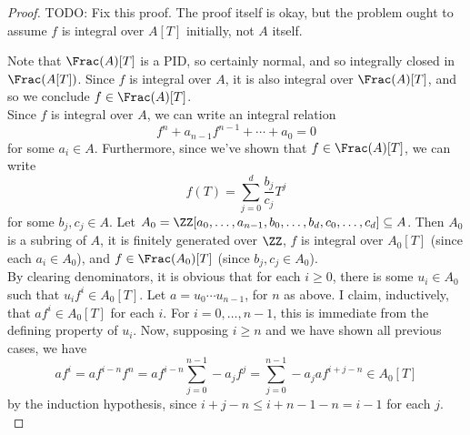 \begin{proof}
	TODO: Fix this proof. The proof itself is okay, but the problem ought to assume $f$ is integral over $A[T]$ initially, not $A$ itself.
	
	
	Note that $\Frac(A)[T]$ is a PID, so certainly normal, and so integrally closed in $\Frac(A[T])$. Since $f$ is integral over $A$, it is also integral over $\Frac(A)[T]$, and so we conclude $f \in \Frac(A)[T]$. \\
	
	Since $f$ is integral over $A$, we can write an integral relation
	\[ f^n + a_{n-1}f^{n-1} + \cdots + a_0 = 0 \]
	for some $a_i \in A$. Furthermore, since we've shown that $f \in \Frac(A)[T]$, we can write
	\[ f(T) = \sum_{j=0}^d \frac{b_j}{c_j}T^j \]
	for some $b_j,c_j \in A$. Let $A_0 = \ZZ[a_0,\ldots,a_{n-1},b_0,\ldots,b_d,c_0,\ldots,c_d] \subseteq A$. Then $A_0$ is a subring of $A$, it is finitely generated over $\ZZ$, $f$ is integral over $A_0[T]$ (since each $a_i \in A_0$), and $f \in \Frac(A_0)[T]$ (since $b_j,c_j \in A_0$). \\
	
	By clearing denominators, it is obvious that for each $i \geq 0$, there is some $u_i \in A_0$ such that $u_if^i \in A_0[T]$. Let $a = u_0 \cdots u_{n-1}$, for $n$ as above. I claim, inductively, that $af^i \in A_0[T]$ for each $i$. For $i=0,\ldots,n-1$, this is immediate from the defining property of $u_i$. Now, supposing $i \geq n$ and we have shown all previous cases, we have
	\[ af^i = af^{i-n}f^n = af^{i-n}\sum_{j=0}^{n-1} -a_jf^j = \sum_{j=0}^{n-1} -a_jaf^{i+j-n} \in A_0[T] \]
	by the induction hypothesis, since $i+j-n \leq i+n-1-n = i-1$ for each $j$. \\
	
	
\end{proof}
